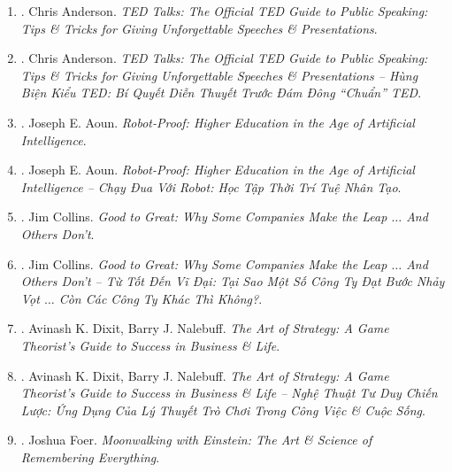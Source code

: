 \documentclass{article}
\begin{document}
\begin{enumerate}
	\item \cite{Anderson_TED}. {\sc Chris Anderson}. {\it TED Talks: The Official TED Guide to Public Speaking: Tips \& Tricks for Giving Unforgettable Speeches \& Presentations}.\hfill{\sf[reading]}
	
	\item \cite{Anderson_TED_VN}. {\sc Chris Anderson}. {\it TED Talks: The Official TED Guide to Public Speaking: Tips \& Tricks for Giving Unforgettable Speeches \& Presentations -- Hùng Biện Kiểu TED: Bí Quyết Diễn Thuyết Trước Đám Đông ``Chuẩn'' TED}.\hfill{\sf[done]}
	
	\item \cite{Aoun_robot-proof}. {\sc Joseph E. Aoun}. {\it Robot-Proof: Higher Education in the Age of Artificial Intelligence}.
	
	\item \cite{Aoun_robot-proof_VN}. {\sc Joseph E. Aoun}. {\it Robot-Proof: Higher Education in the Age of Artificial Intelligence -- Chạy Đua Với Robot: Học Tập Thời Trí Tuệ Nhân Tạo}.\hfill{\sf[done]}
	
	\item \cite{Collins_good2great}. {\sc Jim Collins}. {\it Good to Great: Why Some Companies Make the Leap $\ldots$ And Others Don't}.
	
	\item \cite{Collins_good2great_VN}. {\sc Jim Collins}. {\it Good to Great: Why Some Companies Make the Leap $\ldots$ And Others Don't -- Từ Tốt Đến Vĩ Đại: Tại Sao Một Số Công Ty Đạt Bước Nhảy Vọt $\ldots$ Còn Các Công Ty Khác Thì Không?}.\hfill{\sf[done]}
	
	\item \cite{Dixit_Nalebuff2010}. {\sc Avinash K. Dixit, Barry J. Nalebuff}. {\it The Art of Strategy: A Game Theorist's Guide to Success in Business \& Life}.
	
	\item \cite{Dixit_Nalebuff_strategy}. {\sc Avinash K. Dixit, Barry J. Nalebuff}. {\it The Art of Strategy: A Game Theorist's Guide to Success in Business \& Life -- Nghệ Thuật Tư Duy Chiến Lược: Ứng Dụng Của Lý Thuyết Trò Chơi Trong Công Việc \& Cuộc Sống}.\hfill{\sf[done]}
		
	\item \cite{Foer_remember}. {\sc Joshua Foer}. {\it Moonwalking with Einstein: The Art \& Science of Remembering Everything}. {}
	

\end{enumerate}
\end{document}
